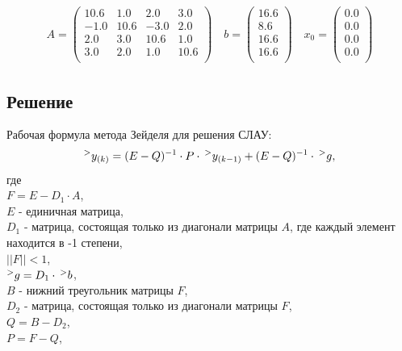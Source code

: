 \documentclass[letterpaper, 11pt]{extarticle}
\begin{document}
\begin{align*}
    A = \begin{pmatrix}
        10.6 & 1.0 & 2.0 & 3.0 \\
        -1.0 & 10.6 & -3.0 & 2.0 \\
        2.0 & 3.0 & 10.6 & 1.0 \\
        3.0 & 2.0 & 1.0 & 10.6 \\
    \end{pmatrix}
    \quad
    b = \begin{pmatrix}
        16.6 \\
        8.6 \\
        16.6 \\
        16.6 \\
    \end{pmatrix}
    \quad
    x_0 = \begin{pmatrix}
        0.0 \\
        0.0 \\
        0.0 \\
        0.0 \\
    \end{pmatrix}
\end{align*}

\subsection*{Решение}

Рабочая формула метода Зейделя для решения СЛАУ:
\begin{equation}
    ^>y_{(k)} = (E - Q)^{-1} \cdot P \cdot \hspace*{0.2em} ^>y_{(k-1)} + (E - Q)^{-1} 
    \cdot \hspace*{0.2em} ^>g,
\end{equation}
где\\
$F = E - D_1 \cdot A$, \\
$E $ - единичная матрица,\\
$D_1 $ - матрица, состоящая только из диагонали матрицы $A$, 
где каждый элемент находится в -1 степени,\\
$||F|| < 1$,\\
$^>g = D_1 \cdot \hspace*{0.2em} ^>b$,\\
$B $ - нижний треугольник матрицы $F$, \\
$D_2 $ - матрица, состоящая только из диагонали матрицы $F$, \\
$Q = B - D_2$, \\
$P = F - Q$, \\
\end{document}
